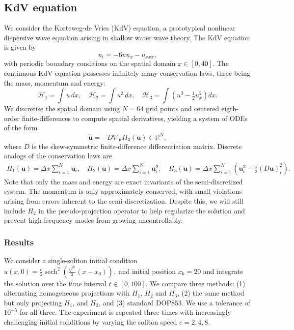 \documentclass[final,3p,times]{elsarticle}
\newcommand{\R}{\mathbb{R}}
\begin{document}
\subsection{KdV equation}
We consider the Korteweg-de Vries (KdV) equation, a prototypical nonlinear dispersive wave equation arising in shallow water wave theory. The KdV equation is given by
$$u_t = - 6uu_x - u_{xxx},$$
with periodic boundary conditions on the spatial domain $x\in[0, 40]$. The continuous KdV equation possesses infinitely many conservation laws, three being the mass, momentum and energy:
\begin{equation}
\mathcal{H}_1 = \int u \,dx,\quad
\mathcal{H}_2 = \int u^2 \,dx ,\quad
\mathcal{H}_3 = \int \left(u^3 - \tfrac{1}{2}u_x^2\right) dx.
\end{equation}
We discretise the spatial domain using $N=64$ grid points and centered eigth-order finite-differences to compute spatial derivatives, yielding a system of ODEs of the form 
$$\dot{\mathbf{u}} = -D\nabla_{\mathbf{u}} H_3(\mathbf{u})\in\R^N,$$
where $D$ is the skew-symmetric finite-difference differentiation matrix. Discrete analogs of the conservation laws are 
\begin{align}
H_1(\mathbf{u}) = \Delta x \sum_{i=1}^N \mathbf{u}_i,\quad
H_2(\mathbf{u}) = \Delta x \sum_{i=1}^N \mathbf{u}_i^2,\quad
H_3(\mathbf{u}) = \Delta x \sum_{i=1}^N \left(\mathbf{u}_i^3 - \tfrac{1}{2}\left(D\mathbf{u}\right)_i^2\right). 
\end{align} 
Note that only the mass and energy are exact invariants of the semi-discretized system. The momentum is only approximately conserved, with small violations arising from errors inherent to the semi-discretization. Despite this, we will still include $H_2$ in the pseudo-projection operator to help regularize the solution and prevent high frequency modes from growing uncontrollably. 
\subsubsection{Results}
We consider a single-soliton initial condition $u(x,0) = \frac{c}{2}\operatorname{sech}^2\!\left(\frac{\sqrt{c}}{2}(x - x_0)\right),$ and initial position $x_0=20$ and integrate the solution over the time interval $t\in[0,100]$. We compare three methods: (1) alternating homogeneous projections with $H_1$, $H_2$ and $H_3$, (2) the same method but only projecting $H_1$, and $H_3$, and (3) standard DOP853. We use a tolerance of $10^{-5}$ for all three. The experiment is repeated three times with increasingly challenging initial conditions by varying the soliton speed $c=2,4,8$.
\end{document}
